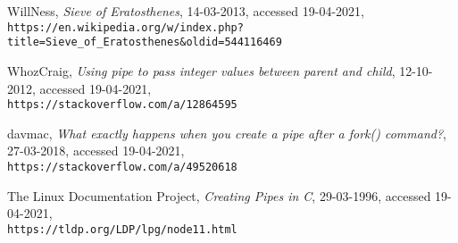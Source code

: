 \documentclass{article}
\begin{document}
    \begin{thebibliography}{10}
        WillNess, \textit{Sieve of Eratosthenes}, 14-03-2013, accessed 19-04-2021, \\\texttt{https://en.wikipedia.org/w/index.php?title=Sieve_of_Eratosthenes&oldid=544116469}

        WhozCraig, \textit{Using pipe to pass integer values between parent and child}, 12-10-2012, accessed 19-04-2021, \\\texttt{https://stackoverflow.com/a/12864595}

        davmac, \textit{What exactly happens when you create a pipe after a fork() command?}, 27-03-2018, accessed 19-04-2021, \\\texttt{https://stackoverflow.com/a/49520618}

        The Linux Documentation Project, \textit{Creating Pipes in C}, 29-03-1996, accessed 19-04-2021, \\\texttt{https://tldp.org/LDP/lpg/node11.html}

    \end{thebibliography}
\end{document}
